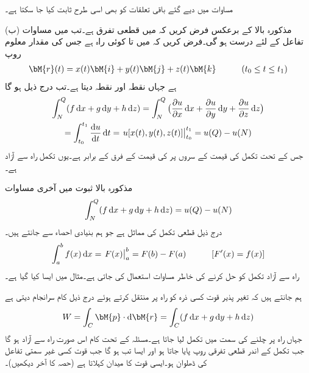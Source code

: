 مساوات  میں دیے گئے باقی تعلقات کو بھی اسی طرح ثابت کیا جا سکتا ہے۔

(ب) مذکورہ بالا کے برعکس فرض کریں کہ  میں  قطعی تفرق ہے۔تب   میں مساوات   تفاعل  کے لئے درست ہو گی۔فرض کریں کہ  میں  تا  کوئی راہ  ہے جس کی مقدار معلوم روپ
\begin{align*}
\bM{r}(t)=x(t)\bM{i}+y(t)\bM{j}+z(t)\bM{k}\quad \quad \quad (t_0\le t\le t_1)
\end{align*}
ہے جہاں  نقطہ  اور  نقطہ  دیتا ہے۔تب درج ذیل ہو گا
\begin{multline*}
\int_N^Q (f\dif x+g\dif y+h\dif z)=\int_N^Q \big(\frac{\partial u}{\partial x}\dif x+\frac{\partial u}{\partial y}\dif y+\frac{\partial u}{\partial z}\dif z\big)\\
=\int_{t_0}^{t_1}\frac{\dif u}{\dif t}\dif t=\left. u[x(t),y(t),z(t)]\right|_{t_0}^{t_1}=u(Q)-u(N)
\end{multline*} 
جس کے تحت تکمل کی قیمت  کے سروں پر  کی قیمت کے فرق کے برابر ہے۔یوں تکمل راہ سے آزاد ہے۔

مذکورہ بالا ثبوت میں آخری مساوات
\begin{align}\label{مساوات_خطی_تکمل_راہ_سے_آزاد_تکمل}
\int_N^Q (f\dif x+g\dif y+h\dif z)=u(Q)-u(N)
\end{align}
درج ذیل قطعی تکمل کی مماثل ہے جو ہم بنیادی احصاء سے جانتے ہیں۔
\begin{align*}
\int_a^b f(x)\dif x=\left. F(x)\right |_a^b=F(b)-F(a)\quad \quad \quad [F'(x)=f(x)]
\end{align*}
راہ سے آزاد تکمل کو حل کرنے کی خاطر مساوات  استعمال کی جاتی ہے۔مثال  میں ایسا کیا گیا ہے۔

ہم جانتے ہیں کہ تغیر پذیر قوت  کسی ذرہ کو راہ  پر منتقل کرتے ہوئے درج ذیل کام  سرانجام دیتی  ہے
\begin{align*}
W=\int_C \bM{p}\cdot \dif \bM{r}=\int_C (f\dif x+g\dif y+h\dif z)
\end{align*}
جہاں راہ پر چلنے کی سمت میں تکمل لیا جاتا ہے۔مسئلہ  کے تحت  کام اس صورت راہ سے آزاد ہو گا جب تکمل کے اندر قطعی تفرقی روپ پایا جاتا ہو اور ایسا تب ہو گا جب قوت  کسی غیر سمتی تفاعل  کی ڈھلوان ہو۔ایسی قوت کا میدان   کہلاتا ہے (حصہ  کا آخر دیکھیں)۔

